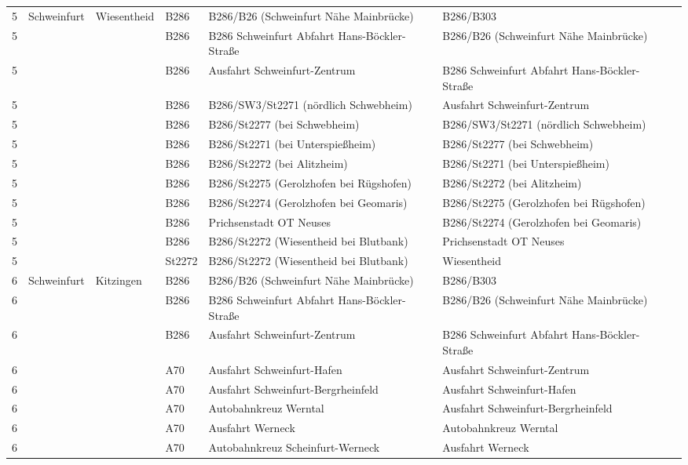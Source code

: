 \begin{tabular}{|l|l|l|l|l|l|l|}
    \hline
    5 & Schweinfurt & Wiesentheid & B286 & B286/B26 (Schweinfurt Nähe Mainbrücke) & B286/B303\\ 
    5 &  &  & B286 & B286 Schweinfurt Abfahrt Hans-Böckler-Straße & B286/B26 (Schweinfurt Nähe Mainbrücke)\\ 
    5 &  &  & B286 & Ausfahrt Schweinfurt-Zentrum & B286 Schweinfurt Abfahrt Hans-Böckler-Straße\\ 
    5 &  &  & B286 & B286/SW3/St2271 (nördlich Schwebheim) & Ausfahrt Schweinfurt-Zentrum\\ 
    5 &  &  & B286 & B286/St2277 (bei Schwebheim) & B286/SW3/St2271 (nördlich Schwebheim)\\ 
    5 &  &  & B286 & B286/St2271 (bei Unterspießheim) & B286/St2277 (bei Schwebheim)\\ 
    5 &  &  & B286 & B286/St2272 (bei Alitzheim) & B286/St2271 (bei Unterspießheim)\\ 
    5 &  &  & B286 & B286/St2275 (Gerolzhofen bei Rügshofen) & B286/St2272 (bei Alitzheim)\\ 
    5 &  &  & B286 & B286/St2274 (Gerolzhofen bei Geomaris) & B286/St2275 (Gerolzhofen bei Rügshofen)\\ 
    5 &  &  & B286 & Prichsenstadt OT Neuses & B286/St2274 (Gerolzhofen bei Geomaris)\\ 
    5 &  &  & B286 & B286/St2272 (Wiesentheid bei Blutbank) & Prichsenstadt OT Neuses\\ 
    5 &  &  & St2272 & B286/St2272 (Wiesentheid bei Blutbank) & Wiesentheid\\ 
    \hline
    6 & Schweinfurt & Kitzingen & B286 & B286/B26 (Schweinfurt Nähe Mainbrücke) & B286/B303\\ 
    6 &  &  & B286 & B286 Schweinfurt Abfahrt Hans-Böckler-Straße & B286/B26 (Schweinfurt Nähe Mainbrücke)\\ 
    6 &  &  & B286 & Ausfahrt Schweinfurt-Zentrum & B286 Schweinfurt Abfahrt Hans-Böckler-Straße\\ 
    6 &  &  & A70 & Ausfahrt Schweinfurt-Hafen & Ausfahrt Schweinfurt-Zentrum\\ 
    6 &  &  & A70 & Ausfahrt Schweinfurt-Bergrheinfeld & Ausfahrt Schweinfurt-Hafen\\ 
    6 &  &  & A70 & Autobahnkreuz Werntal & Ausfahrt Schweinfurt-Bergrheinfeld\\ 
    6 &  &  & A70 & Ausfahrt Werneck & Autobahnkreuz Werntal\\ 
    6 &  &  & A70 & Autobahnkreuz Scheinfurt-Werneck & Ausfahrt Werneck\\ 

\end{tabular}
